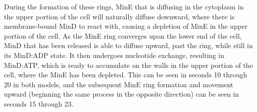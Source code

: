 \documentclass[letterpaper,twocolumn,amsmath,amssymb,pre]{revtex4-1}
\newcommand{\red}[1]{{\bf \color{red} #1}}
\newcommand{\fixme}[1]{\red{[#1]}}
\begin{document}
During the formation of these rings, MinE that is diffusing in the
cytoplasm in the upper portion of the cell will naturally diffuse
downward, where there is membrane-bound MinD to react with, causing a
depletion of MinE in the upper portion of the cell.  As the MinE ring
converges upon the lower end of the cell, MinD that has been released
is able to diffuse upward, past the ring, while still in its MinD:ADP
state.  It then undergoes nucleotide exchange, resulting in MinD:ATP,
which is ready to accumulate on the walls in the upper portion of the
cell, where the MinE has been depleted.  This can be seen in seconds
10 through 20 in both models, and the subsequent MinE ring
formation and movement upward (beginning the same process in the
opposite direction) can be seen in seconds 15 through 23.



\end{document}
